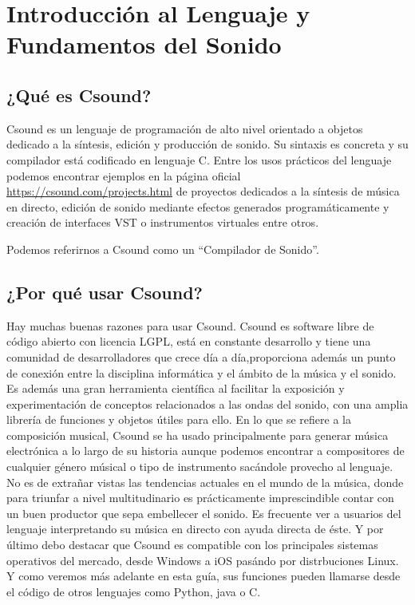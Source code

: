 
\chapter{Introducción al Lenguaje y Fundamentos del Sonido}\label{cap1}
\section{¿Qué es Csound?}\label{sec:intro}

Csound es un lenguaje de programación de alto nivel orientado a objetos dedicado a la síntesis, edición y producción de sonido. Su sintaxis es concreta y su compilador está codificado en lenguaje C. Entre los usos prácticos del lenguaje podemos encontrar ejemplos en la página oficial \url{https://csound.com/projects.html} de proyectos dedicados a la síntesis de música en directo, edición de sonido mediante efectos generados programáticamente y creación de interfaces VST o instrumentos virtuales entre otros.

Podemos referirnos a Csound como un ``Compilador de Sonido''.

\section{¿Por qué usar Csound?}\label{sec:intro}

Hay muchas buenas razones para usar Csound. Csound es software libre de código abierto con licencia LGPL, está en constante desarrollo y tiene una comunidad de desarrolladores que crece día a día,proporciona además un punto de conexión entre la disciplina informática y el ámbito de la música y el sonido. 
Es además una gran herramienta científica al facilitar la exposición y experimentación de conceptos relacionados a las ondas del sonido, con una amplia librería de funciones y objetos útiles para ello. 
En lo que se refiere a la composición musical, Csound se ha usado principalmente para generar música electrónica a lo largo de su historia aunque podemos encontrar a compositores de cualquier género músical o tipo de instrumento sacándole provecho al lenguaje. No es de extrañar vistas las tendencias actuales en el mundo de la música, donde para triunfar a nivel multitudinario es prácticamente imprescindible contar con un buen productor que sepa embellecer el sonido.
Es frecuente ver a usuarios del lenguaje interpretando su música en directo con ayuda directa de éste.
Y por último debo destacar que Csound es compatible con los principales sistemas operativos del mercado, desde Windows a iOS pasándo por distrbuciones Linux. Y como veremos más adelante en esta guía, sus funciones pueden llamarse desde el código de otros lenguajes como Python, java o C.
\pagebreak

